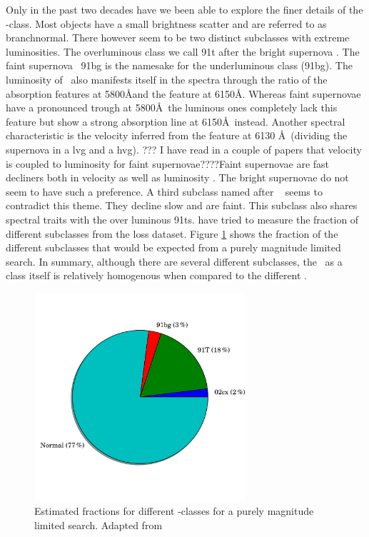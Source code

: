 Only in the past two decades have we been able to explore the finer details of the \sneia-class. Most objects have a small brightness scatter and are referred to as \gls{branchnormal}. There however seem to be two distinct subclasses with extreme luminosities. The overluminous class we call \gls{91t} after the bright supernova  \citet{1992AJ....103.1632P}. The faint supernova \ \citep{1992AJ....104.1543F}\gls{91bg} is the namesake for the underluminous class (\gls{91bg}). The luminosity of \sneia\ also manifests itself in the spectra through the ratio of the  absorption features at 5800\AA and the feature at 6150\AA. Whereas faint supernovae have a pronounced trough at 5800\AA\ the luminous ones completely lack this feature but show a strong absorption line at 6150\AA\ instead. Another spectral characteristic is the velocity inferred from the  feature at 6130 \AA\ (dividing the supernova in a \gls{lvg} and a \gls{hvg}). ??? I have read in a couple of papers that velocity is coupled to luminosity for faint supernovae????Faint supernovae are fast decliners both in velocity as well as luminosity \citet{2005ApJ...623.1011B}. The bright supernovae do not seem to have such a preference. A third subclass named after \ \citep{2003PASP..115..453L} seems to contradict this theme. They decline slow and are faint. This subclass also shares spectral traits with the over luminous \glspl{91t}. \citet{2011MNRAS.412.1441L} have tried to measure the fraction of different subclasses from the \gls{loss} dataset. Figure \ref{fig:ia_fracs} shows the fraction of the different subclasses that would be expected from a purely magnitude limited search. In summary, although there are several different subclasses, the \snia\ as a class itself is relatively homogenous when compared to the different \sneii.

\begin{figure}[htbp] %
   \centering
   \includegraphics[width=0.7\textwidth, trim=0 2.5cm 0 0cm]{chapter_intro/plots/plot_ia_fracs.pdf} 
   \caption{Estimated fractions for different -classes for a purely magnitude limited search. Adapted from \citet{2011MNRAS.412.1441L}}
   \label{fig:ia_fracs}
\end{figure}

